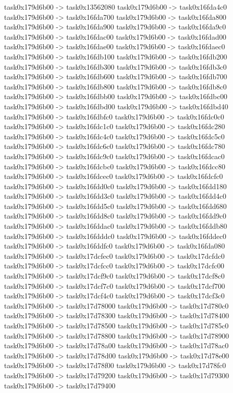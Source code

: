 {	task0x179d6b00 -> task0x13562080
	task0x179d6b00 -> task0x16fda4c0
	task0x179d6b00 -> task0x16fda700
	task0x179d6b00 -> task0x16fda800
	task0x179d6b00 -> task0x16fda900
	task0x179d6b00 -> task0x16fda9c0
	task0x179d6b00 -> task0x16fdac00
	task0x179d6b00 -> task0x16fdad00
	task0x179d6b00 -> task0x16fdae00
	task0x179d6b00 -> task0x16fdaec0
	task0x179d6b00 -> task0x16fdb100
	task0x179d6b00 -> task0x16fdb200
	task0x179d6b00 -> task0x16fdb300
	task0x179d6b00 -> task0x16fdb3c0
	task0x179d6b00 -> task0x16fdb600
	task0x179d6b00 -> task0x16fdb700
	task0x179d6b00 -> task0x16fdb800
	task0x179d6b00 -> task0x16fdb8c0
	task0x179d6b00 -> task0x16fdbb00
	task0x179d6b00 -> task0x16fdbc00
	task0x179d6b00 -> task0x16fdbd00
	task0x179d6b00 -> task0x16fdbd40
	task0x179d6b00 -> task0x16fdbfc0
	task0x179d6b00 -> task0x16fdc0c0
	task0x179d6b00 -> task0x16fdc1c0
	task0x179d6b00 -> task0x16fdc280
	task0x179d6b00 -> task0x16fdc4c0
	task0x179d6b00 -> task0x16fdc5c0
	task0x179d6b00 -> task0x16fdc6c0
	task0x179d6b00 -> task0x16fdc780
	task0x179d6b00 -> task0x16fdc9c0
	task0x179d6b00 -> task0x16fdcac0
	task0x179d6b00 -> task0x16fdcbc0
	task0x179d6b00 -> task0x16fdcc80
	task0x179d6b00 -> task0x16fdcec0
	task0x179d6b00 -> task0x16fdcfc0
	task0x179d6b00 -> task0x16fdd0c0
	task0x179d6b00 -> task0x16fdd180
	task0x179d6b00 -> task0x16fdd3c0
	task0x179d6b00 -> task0x16fdd4c0
	task0x179d6b00 -> task0x16fdd5c0
	task0x179d6b00 -> task0x16fdd680
	task0x179d6b00 -> task0x16fdd8c0
	task0x179d6b00 -> task0x16fdd9c0
	task0x179d6b00 -> task0x16fddac0
	task0x179d6b00 -> task0x16fddb80
	task0x179d6b00 -> task0x16fdddc0
	task0x179d6b00 -> task0x16fddec0
	task0x179d6b00 -> task0x16fddfc0
	task0x179d6b00 -> task0x16fda080
	task0x179d6b00 -> task0x17dcfec0
	task0x179d6b00 -> task0x17dcfdc0
	task0x179d6b00 -> task0x17dcfcc0
	task0x179d6b00 -> task0x17dcfc00
	task0x179d6b00 -> task0x17dcf9c0
	task0x179d6b00 -> task0x17dcf8c0
	task0x179d6b00 -> task0x17dcf7c0
	task0x179d6b00 -> task0x17dcf700
	task0x179d6b00 -> task0x17dcf4c0
	task0x179d6b00 -> task0x17dcf3c0
	task0x179d6b00 -> task0x17d78000
	task0x179d6b00 -> task0x17d780c0
	task0x179d6b00 -> task0x17d78300
	task0x179d6b00 -> task0x17d78400
	task0x179d6b00 -> task0x17d78500
	task0x179d6b00 -> task0x17d785c0
	task0x179d6b00 -> task0x17d78800
	task0x179d6b00 -> task0x17d78900
	task0x179d6b00 -> task0x17d78a00
	task0x179d6b00 -> task0x17d78ac0
	task0x179d6b00 -> task0x17d78d00
	task0x179d6b00 -> task0x17d78e00
	task0x179d6b00 -> task0x17d78f00
	task0x179d6b00 -> task0x17d78fc0
	task0x179d6b00 -> task0x17d79200
	task0x179d6b00 -> task0x17d79300
	task0x179d6b00 -> task0x17d79400
}
